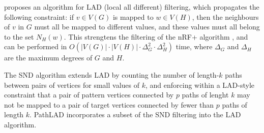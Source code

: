 
\citet{DBLP:journals/ai/Solnon10} proposes an algorithm for LAD (local all
different) filtering, which propagates the following constraint: if $v \in
V(G)$ is mapped to $w \in V(H)$, then the neighbours of $v$ in $G$ must all be
mapped to different values, and these values must all belong to the set
$N_H(w)$.  This strengtens the filtering of the nRF+ algorithm
\citep{DBLP:journals/mscs/LarrosaV02}, and can be performed in $O(|V(G)| \cdot
|V(H)| \cdot \Delta_G^2 \cdot \Delta_H^2)$ time, where $\Delta_G$ and
$\Delta_H$ are the maximum degrees of $G$ and $H$.

The SND algorithm \citep{DBLP:conf/cp/AudemardLMGP14} extends LAD by counting
the number of length-$k$ paths between pairs of vertices for small values of
$k$, and enforcing within a LAD-style constraint that a pair of pattern
vertices connected by $p$ paths of lenght $k$ may not be mapped to a pair of
target vertices connected by fewer than $p$ paths of length $k$.  PathLAD
\citep{DBLP:conf/lion/KotthoffMS16} incorporates a subset of the SND filtering
into the LAD algorithm.

